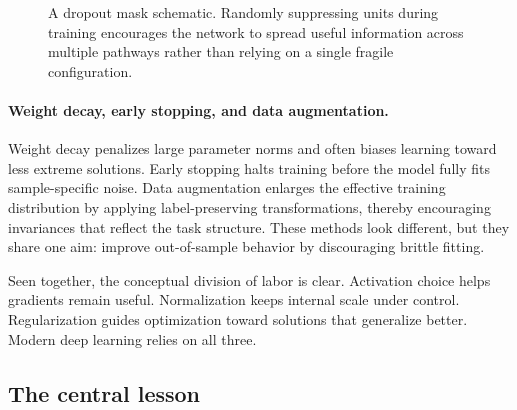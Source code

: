 \begin{figure}[tbp]
\centering
{}
\caption{A dropout mask schematic. Randomly suppressing units during training encourages the network to spread useful information across multiple pathways rather than relying on a single fragile configuration.}
\end{figure}

\paragraph{Weight decay, early stopping, and data augmentation.}
Weight decay penalizes large parameter norms and often biases learning toward less extreme solutions.
Early stopping halts training before the model fully fits sample-specific noise.
Data augmentation enlarges the effective training distribution by applying label-preserving transformations, thereby encouraging invariances that reflect the task structure.
These methods look different, but they share one aim: improve out-of-sample behavior by discouraging brittle fitting.

\medskip

Seen together, the conceptual division of labor is clear.
Activation choice helps gradients remain useful.
Normalization keeps internal scale under control.
Regularization guides optimization toward solutions that generalize better.
Modern deep learning relies on all three.

\subsection*{The central lesson}

